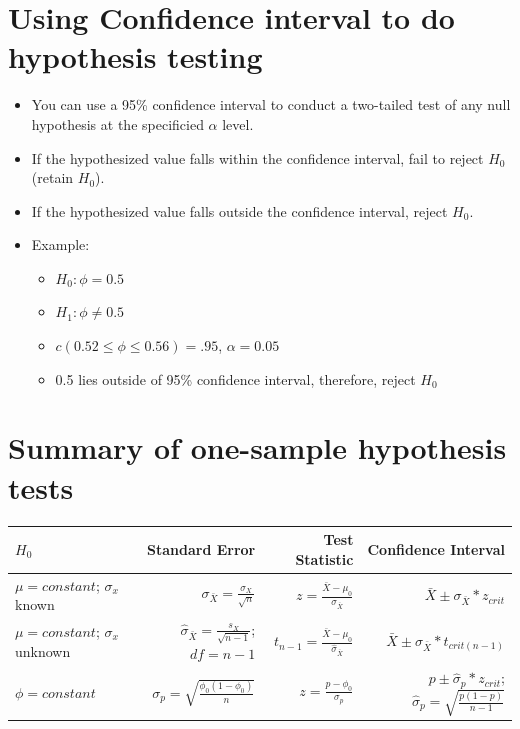 \documentclass[12pt]{article}
\begin{document}
\section{Using Confidence interval to do hypothesis
testing}\label{using-confidence-interval-to-do-hypothesis-testing}

\begin{itemize}
\itemsep1pt\parskip0pt
\item
  You can use a 95\% confidence interval to conduct a two-tailed test of
  any null hypothesis at the specificied \(\alpha\) level.
\item
  If the hypothesized value falls within the confidence interval, fail
  to reject \(H_{0}\) (retain \(H_{0}\)).
\item
  If the hypothesized value falls outside the confidence interval,
  reject \(H_{0}\).
\item
  Example:

  \begin{itemize}
  \itemsep1pt\parskip0pt
  \item
    \(H_{0}: \phi = 0.5\)
  \item
    \(H_{1}: \phi \neq 0.5\)
  \item
    \(c(0.52 \leq \phi \leq 0.56) = .95\), \(\alpha = 0.05\)
  \item
    0.5 lies outside of 95\% confidence interval, therefore, reject
    \(H_{0}\)
  \end{itemize}
\end{itemize}

\section{Summary of one-sample hypothesis
tests}\label{summary-of-one-sample-hypothesis-tests}

\begin{longtable}[c]{@{}lrrr@{}}
\toprule
\(H_{0}\) & Standard Error & Test Statistic & Confidence
Interval\tabularnewline
\midrule
\endhead
\(\mu = constant\); \(\sigma_{x}\) known &
\(\sigma_{\bar{X}} = \frac{\sigma_{X}}{\sqrt{n}}\) &
\(z = \frac{\bar{X} - \mu_{0}}{\sigma_{\bar{X}}}\) &
\(\bar{X} \pm \sigma_{\bar{X}} * z_{crit}\)\tabularnewline
\(\mu = constant\); \(\sigma_{x}\) unknown &
\(\hat{\sigma}_{\bar{X}} = \frac{s_{X}}{\sqrt{n - 1}}\); \(df = n - 1\)
& \(t_{n - 1} = \frac{\bar{X} - \mu_{0}}{\hat{\sigma}_{\bar{X}}}\) &
\(\bar{X} \pm \hat{\sigma}_{\bar{X}} * t_{crit(n - 1)}\)\tabularnewline
\(\phi = constant\) &
\(\sigma_{p} = \sqrt{\frac{\phi_{0} (1 - \phi_{0})}{n}}\) &
\(z = \frac{p - \phi_{0}}{\sigma_{p}}\) &
\(p \pm \hat{\sigma}_{p} * z_{crit}\);
\(\hat{\sigma}_{p} = \sqrt{\frac{p (1 - p)}{n - 1}}\)\tabularnewline
\bottomrule
\end{longtable}
\end{document}
